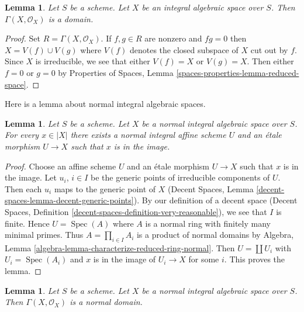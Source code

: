 \documentclass{stacks-project}
\theoremstyle{plain}
\newtheorem{lemma}[subsection]{Lemma}
\theoremstyle{definition}
\theoremstyle{remark}
\numberwithin{equation}{subsection}
\def\Spec{\mathop{\mathrm{Spec}}}
\begin{document}
\begin{lemma}
\label{lemma-integral-sections}
Let $S$ be a scheme. Let $X$ be an integral algebraic space over $S$.
Then $\Gamma(X, \mathcal{O}_X)$ is a domain.
\end{lemma}

\begin{proof}
Set $R = \Gamma(X, \mathcal{O}_X)$. If $f, g \in R$ are nonzero and
$fg = 0$ then $X = V(f) \cup V(g)$ where $V(f)$ denotes the closed subspace
of $X$ cut out by $f$. Since $X$ is irreducible, we see that either
$V(f) = X$ or $V(g) = X$. Then either $f = 0$ or $g = 0$ by
Properties of Spaces, Lemma \ref{spaces-properties-lemma-reduced-space}.
\end{proof}

\noindent
Here is a lemma about normal integral algebraic spaces.

\begin{lemma}
\label{lemma-normal-integral-cover-by-affines}
Let $S$ be a scheme. Let $X$ be a normal integral algebraic space over $S$.
For every $x \in |X|$ there exists a normal integral affine scheme $U$
and an \'etale morphism $U \to X$ such that $x$ is in the image.
\end{lemma}

\begin{proof}
Choose an affine scheme $U$ and an \'etale morphism $U \to X$ such that
$x$ is in the image. Let $u_i$, $i \in I$ be the generic points of irreducible
components of $U$. Then each $u_i$ maps to the generic point of $X$
(Decent Spaces, Lemma \ref{decent-spaces-lemma-decent-generic-points}). By 
our definition of a decent space
(Decent Spaces, Definition \ref{decent-spaces-definition-very-reasonable}),
we see that $I$ is finite. Hence $U = \Spec(A)$ where $A$ is a normal ring
with finitely many minimal primes.
Thus $A = \prod_{i \in I} A_i$ is a product of normal domains by
Algebra, Lemma \ref{algebra-lemma-characterize-reduced-ring-normal}.
Then $U = \coprod U_i$ with $U_i = \Spec(A_i)$ and $x$ is in the image of
$U_i \to X$ for some $i$. This proves the lemma.
\end{proof}

\begin{lemma}
\label{lemma-normal-integral-sections}
Let $S$ be a scheme. Let $X$ be a normal integral algebraic space over $S$.
Then $\Gamma(X, \mathcal{O}_X)$ is a normal domain.
\end{lemma}
\end{document}
